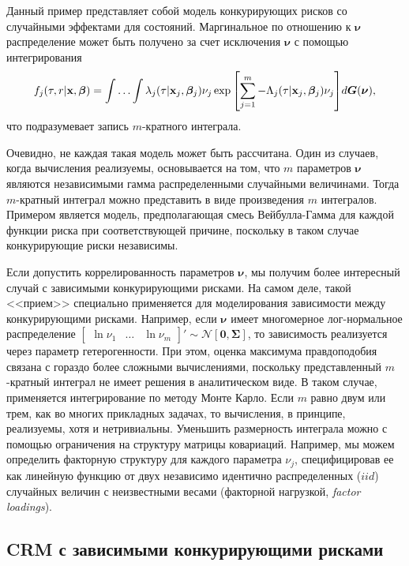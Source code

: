 Данный пример представляет собой модель конкурирующих рисков со случайными эффектами для состояний. Маргинальное по отношению к $\bm{\nu}$ распределение может быть получено за счет исключения $\bm{\nu}$ с помощью интегрирования
    $$f_j(\tau,r|\mathbf{x},\bm{\beta}) = \int \ldots  \int \lambda_j(\tau|\mathbf{x}_j,\bm{\beta}_j)\nu_j \exp{\left[ \sum^{m}_{j=1} -\Lambda_j(\tau|\mathbf{x}_j,\bm{\beta}_j)\nu_j \right]} d\bm{G}(\bm{\nu}),$$
что подразумевает запись $m$-кратного интеграла.

Очевидно, не каждая такая модель может быть рассчитана. Один из случаев, когда вычисления реализуемы, основывается на том, что $m$ параметров $\bm{\nu}$ являются независимыми гамма распределенными случайными величинами. Тогда $m$-кратный интеграл можно представить в виде произведения $m$ интегралов. Примером является модель, предполагающая смесь Вейбулла-Гамма для каждой функции риска при соответствующей причине, поскольку в таком случае конкурирующие риски независимы.

Если допустить коррелированность параметров $\bm{\nu}$, мы получим более интересный случай с зависимыми конкурирующими рисками. На самом деле, такой <<прием>> специально применяется для моделирования зависимости между конкурирующими рисками. Например, если $\bm{\nu}$ имеет многомерное лог-нормальное распределение $\begin{bmatrix} \ln\nu_1 & \ldots  & \ln\nu_m \end{bmatrix}' \sim \mathcal{N}[\bm{0}, \bm{\Sigma}]$, то зависимость реализуется через параметр гетерогенности. При этом, оценка максимума правдоподобия связана с гораздо более сложными вычислениями, поскольку представленный $m$-кратный интеграл не имеет решения в аналитическом виде. В таком случае, применяется интегрирование по методу Монте Карло. Если $m$ равно двум или трем, как во многих прикладных задачах, то вычисления, в принципе, реализуемы, хотя и нетривиальны. Уменьшить размерность интеграла можно с помощью ограничения на структуру матрицы ковариаций. Например, мы можем определить факторную структуру для каждого параметра $\nu_j$, специфицировав ее как линейную функцию от двух независимо идентично распределенных ($iid$) случайных величин с неизвестными весами (факторной нагрузкой, \textit{factor loadings}).


\subsection{CRM с зависимыми конкурирующими рисками}\label{sec:19.2.6}


